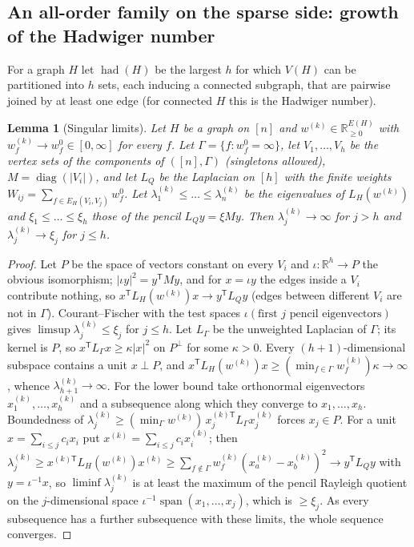 \documentclass[11pt]{amsart}
\newtheorem{lemma}[theorem]{Lemma}
\theoremstyle{definition}
\theoremstyle{remark}
\providecommand{\R}{\mathbb R}
\begin{document}
\subsection{An all-order family on the sparse side: growth of the Hadwiger number}
\label{R4:subsec:hadwiger}

For a graph $H$ let $\operatorname{had}(H)$ be the largest $h$ for which
$V(H)$ can be partitioned into $h$ sets, each inducing a connected
subgraph, that are pairwise joined by at least one edge (for connected $H$
this is the Hadwiger number).

\begin{lemma}[Singular limits]\label{R4:lem:singular}
Let $H$ be a graph on $[n]$ and $w^{(k)}\in\R^{E(H)}_{\ge0}$ with
$w^{(k)}_f\to w^0_f\in[0,\infty]$ for every $f$.  Let
$\Gamma=\{f:w^0_f=\infty\}$, let $V_1,\dots,V_h$ be the vertex sets of the
components of $([n],\Gamma)$ (singletons allowed), $M=\operatorname{diag}(|V_i|)$,
and let $L_Q$ be the Laplacian on $[h]$ with the finite weights
$W_{ij}=\sum_{f\in E_H(V_i,V_j)}w^0_f$.  Let
$\lambda^{(k)}_1\le\dots\le\lambda^{(k)}_n$ be the eigenvalues of
$L_H(w^{(k)})$ and $\xi_1\le\dots\le\xi_h$ those of the pencil
$L_Qy=\xi My$.  Then $\lambda^{(k)}_j\to\infty$ for $j>h$ and
$\lambda^{(k)}_j\to\xi_j$ for $j\le h$.
\end{lemma}

\begin{proof}
Let $P$ be the space of vectors constant on every $V_i$ and $\iota:\R^h\to
P$ the obvious isomorphism; $|\iota y|^2=y^{\mathsf T}My$, and for $x=\iota
y$ the edges inside a $V_i$ contribute nothing, so
$x^{\mathsf T}L_H(w^{(k)})x\to y^{\mathsf T}L_Qy$ (edges between different
$V_i$ are not in $\Gamma$).  Courant--Fischer with the test spaces
$\iota(\text{first $j$ pencil eigenvectors})$ gives
$\limsup\lambda_j^{(k)}\le\xi_j$ for $j\le h$.  Let $L_\Gamma$ be the
unweighted Laplacian of $\Gamma$; its kernel is $P$, so $x^{\mathsf
T}L_\Gamma x\ge\kappa|x|^2$ on $P^\perp$ for some $\kappa>0$.  Every
$(h+1)$-dimensional subspace contains a unit $x\perp P$, and
$x^{\mathsf T}L_H(w^{(k)})x\ge(\min_{f\in\Gamma}w^{(k)}_f)\kappa\to\infty$,
whence $\lambda^{(k)}_{h+1}\to\infty$.  For the lower bound take
orthonormal eigenvectors $x^{(k)}_1,\dots,x^{(k)}_h$ and a subsequence
along which they converge to $x_1,\dots,x_h$.  Boundedness of
$\lambda^{(k)}_j\ge(\min_\Gamma w^{(k)})\,x_j^{(k)\mathsf T}L_\Gamma x^{(k)}_j$
forces $x_j\in P$.  For a unit $x=\sum_{i\le j}c_ix_i$ put
$x^{(k)}=\sum_{i\le j}c_ix^{(k)}_i$; then $\lambda_j^{(k)}\ge x^{(k)\mathsf
T}L_H(w^{(k)})x^{(k)}\ge\sum_{f\notin\Gamma}w^{(k)}_f(x^{(k)}_a-x^{(k)}_b)^2
\to y^{\mathsf T}L_Qy$ with $y=\iota^{-1}x$, so $\liminf\lambda^{(k)}_j$ is at
least the maximum of the pencil Rayleigh quotient on the $j$-dimensional
space $\iota^{-1}\operatorname{span}(x_1,\dots,x_j)$, which is $\ge\xi_j$.
As every subsequence has a further subsequence with these limits, the
whole sequence converges.
\end{proof}
\end{document}
